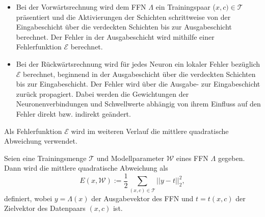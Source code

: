 \begin{itemize}
    \item Bei der Vorwärtsrechnung wird dem FFN $\Lambda$ ein Trainingspaar ($x,c) \in \mathcal{T}$ präsentiert und die Aktivierungen der Schichten schrittweise von der Eingabeschicht über die verdeckten Schichten bis zur Ausgabeschicht berechnet. Der Fehler in der Ausgabeschicht wird mithilfe einer Fehlerfunktion $\mathcal{E}$ berechnet.
    \item Bei der Rückwärtsrechnung wird für jedes Neuron ein lokaler Fehler bezüglich $\mathcal{E}$ berechnet, beginnend in der Ausgabeschicht über die verdeckten Schichten bis zur Eingabeschicht. Der Fehler wird über die Ausgabe- zur Eingabeschicht zurück propagiert. Dabei werden die Gewichtungen der Neuronenverbindungen und Schwellwerte abhängig von ihrem Einfluss auf den Fehler direkt bzw. indirekt geändert.
\end{itemize}
Als Fehlerfunktion $\mathcal{E}$ wird im weiteren Verlauf die mittlere quadratische Abweichung verwendet.
\begin{defi}
    \label{def:MSE}
    Seien eine Trainingsmenge $\mathcal{T}$ und Modellparameter $\mathcal{W}$ eines FFN $\Lambda$ gegeben. Dann wird die mittlere quadratische Abweichung als
\begin{equation*}
    E(x, \mathcal{W}):=\frac{1}{2} \sum_{(x,c) \in \mathcal{T}} ||y-t||_2^2,
\end{equation*}
definiert, wobei $y=\Lambda(x)$ der Ausgabevektor des FFN und $t=t(x,c)$ der Zielvektor des Datenpaars $(x,c)$ ist.
\end{defi}

